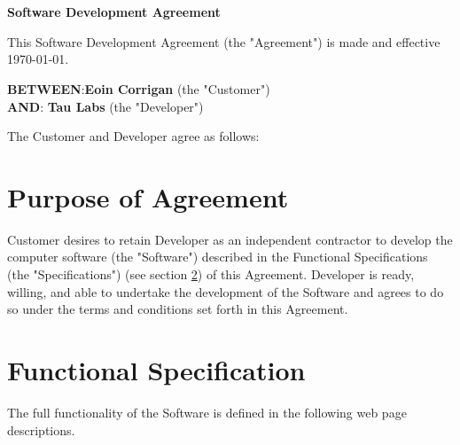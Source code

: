 \documentclass[11pt]{article}
\begin{document}

\newpage
\newpage
\section*{}
\begin{center}
{\bf \LARGE Software Development Agreement} 
\end{center}
\setlength{\parskip}{24pt} %
This Software Development Agreement (the "Agreement") is made and effective {\today}.
\setlength{\parskip}{6pt} %
\begin{tabbing}
{\bf BETWEEN}:\hspace{0.2in}\={\bf Eoin Corrigan} (the "Customer") \\
{\bf AND}:\> {\bf Tau Labs } (the "Developer") 
\end{tabbing}
The Customer and Developer agree as follows:
\section{Purpose of Agreement}
Customer desires to retain Developer as an independent contractor to develop the computer software (the "Software") described in the Functional Specifications (the "Specifications") (see section \ref{sec:functional_spec}) of this Agreement. Developer is ready, willing, and able to undertake the development of the Software and agrees to do so under the terms and conditions set forth in this Agreement.
\section{Functional Specification}
\label{sec:functional_spec}
The full functionality of the Software is defined in the following web page descriptions.
\end{document}
